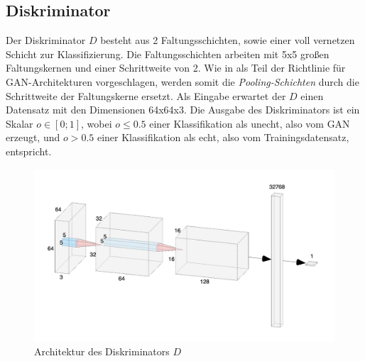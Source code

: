 \documentclass[twocolumn,10pt]{asme2ej}
\begin{document}
\subsection{Diskriminator}
Der Diskriminator $D$ besteht aus 2 Faltungsschichten, sowie einer voll vernetzen Schicht zur Klassifizierung. Die Faltungsschichten arbeiten mit 5x5 großen Faltungskernen und einer Schrittweite von 2. Wie in \cite{radford2015unsupervised} als Teil der Richtlinie für GAN-Architekturen vorgeschlagen, werden somit die \emph{Pooling-Schichten} durch die Schrittweite der Faltungskerne ersetzt. Als Eingabe erwartet der $D$ einen Datensatz mit den Dimensionen 64x64x3. Die Ausgabe des Diskriminators ist ein Skalar $o \in \left[ 0 ; 1  \right]$, wobei $o \leq 0.5$ einer Klassifikation als unecht, also vom GAN erzeugt, und $o > 0.5$ einer Klassifikation als echt, also vom Trainingsdatensatz, entspricht.
\begin{figure}[h]
	\includegraphics[scale=0.12]{disc.png}
	\caption[center]{Architektur des Diskriminators $D$}
	\label{fig:disc}
\end{figure}
\end{document}
